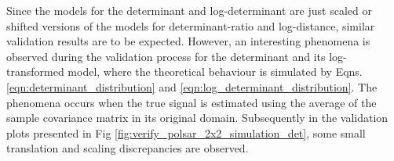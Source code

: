 \documentclass[journal]{IEEEtran}
\begin{document}
Since the models for the determinant and log-determinant are just scaled or shifted versions of the models for determinant-ratio and log-distance, similar validation results are to be expected. 
However, an interesting phenomena is observed during the validation process for the determinant and its log-transformed model,
  where the theoretical behaviour is simulated by Eqns. \ref{eqn:determinant_distribution} and \ref{eqn:log_determinant_distribution}.
The phenomena occurs when the true signal is estimated using the average of the sample covariance matrix in its original domain.
Subsequently in the validation plots presented in Fig \ref{fig:verify_polsar_2x2_simulation_det}, some small translation and scaling discrepancies are observed.%
\end{document}

